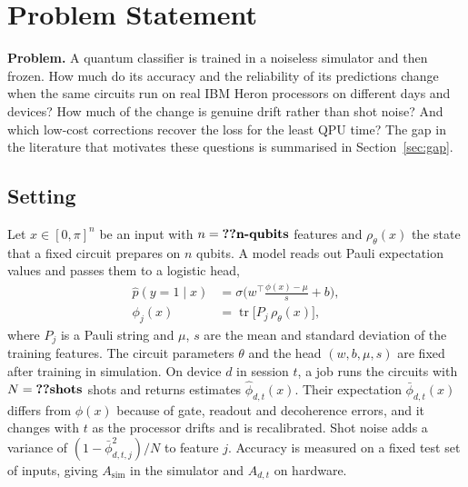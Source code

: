 \section{Problem Statement}
\label{sec:problem}

\textbf{Problem.} A quantum classifier is trained in a noiseless simulator and then frozen. How
much do its accuracy and the reliability of its predictions change when the same circuits run
on real IBM Heron processors on different days and devices? How much of the change is genuine
drift rather than shot noise? And which low-cost corrections recover the loss for the least QPU
time? The gap in the literature that motivates these questions is summarised in
Section~\ref{sec:gap}.

\subsection{Setting}
Let $x\in[0,\pi]^{n}$ be an input with $n=\val{n-qubits}$ features and $\rho_\theta(x)$ the state
that a fixed circuit prepares on $n$ qubits. A model reads out Pauli expectation values and
passes them to a logistic head,
\begin{align}
\hat p(y=1\mid x)&=\sigma\!\Big(w^\top\frac{\phi(x)-\mu}{s}+b\Big), \label{eq:model}\\
\phi_j(x)&=\operatorname{tr}\!\big[P_j\,\rho_\theta(x)\big], \nonumber
\end{align}
where $P_j$ is a Pauli string and $\mu$, $s$ are the mean and standard deviation of the training
features. The circuit parameters $\theta$ and the head $(w,b,\mu,s)$ are fixed after training in
simulation. On device $d$ in session $t$, a job runs the circuits with $N=\val{shots}$ shots and
returns estimates $\hat\phi_{d,t}(x)$. Their expectation $\bar\phi_{d,t}(x)$ differs from
$\phi(x)$ because of gate, readout and decoherence errors, and it changes with $t$ as the
processor drifts and is recalibrated. Shot noise adds a variance of
$(1-\bar\phi_{d,t,j}^{2})/N$ to feature $j$. Accuracy is measured on a fixed test set of
 inputs, giving $A_{\mathrm{sim}}$ in the simulator and $A_{d,t}$ on hardware.

